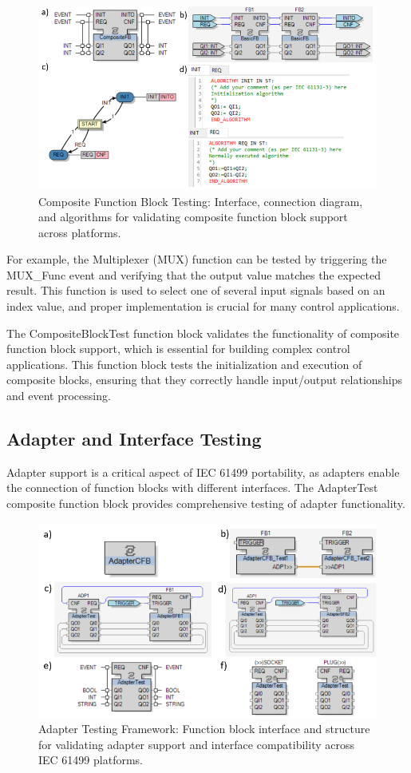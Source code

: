 \begin{figure}[!htbp]
    \centering
    \includegraphics[width=0.8\columnwidth]{MX_Papers/Paper8/Figures/CFBTest.PNG}
    \caption{Composite Function Block Testing: Interface, connection diagram, and algorithms for validating composite function block support across platforms.}
    \label{fig:composite_test}
\end{figure}

For example, the Multiplexer (MUX) function can be tested by triggering the MUX\_Func event and verifying that the output value matches the expected result. This function is used to select one of several input signals based on an index value, and proper implementation is crucial for many control applications.

The CompositeBlockTest function block validates the functionality of composite function block support, which is essential for building complex control applications. This function block tests the initialization and execution of composite blocks, ensuring that they correctly handle input/output relationships and event processing.

\subsection{Adapter and Interface Testing}

Adapter support is a critical aspect of IEC 61499 portability, as adapters enable the connection of function blocks with different interfaces. The AdapterTest composite function block provides comprehensive testing of adapter functionality.

\begin{figure}[!htbp]
    \centering
    \includegraphics[width=0.8\columnwidth]{MX_Papers/Paper8/Figures/AdapterCFB.PNG}
    \caption{Adapter Testing Framework: Function block interface and structure for validating adapter support and interface compatibility across IEC 61499 platforms.}
    \label{fig:adapter_test}
\end{figure}

